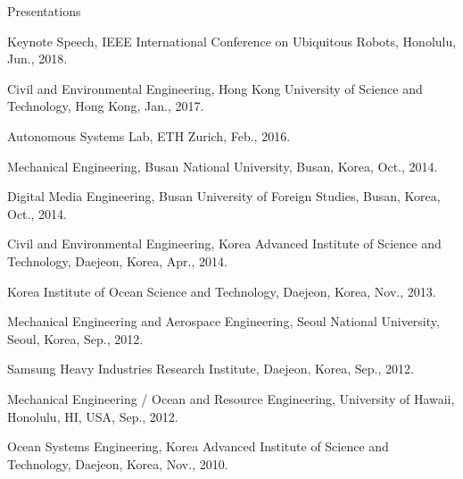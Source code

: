 \begin{rSection}{Presentations}

\begin{pubSubsection}{}
  \item Keynote Speech, IEEE International Conference on Ubiquitous Robots, Honolulu, Jun., 2018.


  \item Civil and Environmental Engineering, Hong Kong University of Science and Technology, Hong Kong, Jan., 2017.




  \item Autonomous Systems Lab, ETH Zurich, Feb., 2016.
  


  \item Mechanical Engineering, Busan National University, Busan, Korea, Oct., 2014.
  \item Digital Media Engineering, Busan University of Foreign Studies, Busan, Korea, Oct., 2014.
  \item Civil and Environmental Engineering, Korea Advanced Institute of Science and Technology, Daejeon, Korea, Apr., 2014.
  \item Korea Institute of Ocean Science and Technology, Daejeon, Korea, Nov., 2013.
  \item Mechanical Engineering and Aerospace Engineering, Seoul National University, Seoul, Korea, Sep., 2012.
  \item Samsung Heavy Industries Research Institute, Daejeon, Korea, Sep., 2012.
  \item Mechanical Engineering / Ocean and Resource Engineering, University of Hawaii, Honolulu, HI, USA, Sep., 2012.
  \item Ocean Systems Engineering, Korea Advanced Institute of Science and Technology, Daejeon, Korea, Nov., 2010.
\end{pubSubsection}

\end{rSection}
